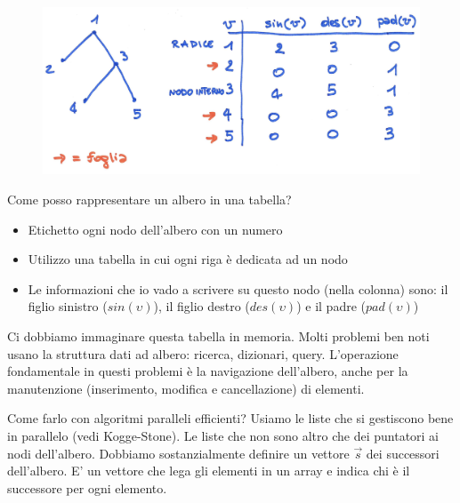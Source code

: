 \begin{figure}[h]
    \centering
    \includegraphics[scale=0.35]{images/ciclo_eureliano.png}
\end{figure}

Come posso rappresentare un albero in una tabella?
\begin{itemize}
    \item Etichetto ogni nodo dell'albero con un numero
    \item Utilizzo una tabella in cui ogni riga è dedicata ad un nodo
    \item Le informazioni che io vado a scrivere su questo nodo (nella colonna) sono: il figlio sinistro ($sin(\upsilon)$), il figlio destro ($des(\upsilon)$) e il padre ($pad(\upsilon)$)
\end{itemize}

Ci dobbiamo immaginare questa tabella in memoria. Molti problemi ben noti usano la struttura dati ad albero: ricerca, dizionari, query. L'operazione fondamentale in questi problemi è la navigazione dell'albero, anche per la manutenzione (inserimento, modifica e cancellazione) di elementi.

Come farlo con algoritmi paralleli efficienti? Usiamo le liste che si gestiscono bene in parallelo (vedi Kogge-Stone). Le liste che non sono altro che dei puntatori ai nodi dell'albero. Dobbiamo sostanzialmente definire un vettore $\vec{s}$ dei successori dell'albero. E' un vettore che lega gli elementi in un array e indica chi è il successore per ogni elemento.

